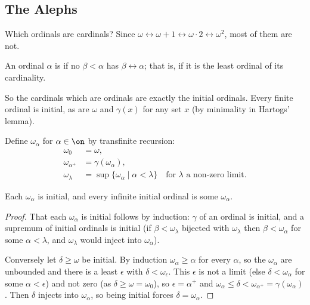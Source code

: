 \subsection{The Alephs}

Which ordinals are cardinals? Since $\omega \leftrightarrow \omega + 1 \leftrightarrow \omega \cdot 2 \leftrightarrow \omega^2$, most of them are not.

\begin{definition}
  An ordinal $\alpha$ is  if no $\beta < \alpha$ has $\beta \leftrightarrow \alpha$; that is, if it is the least ordinal of its cardinality.
\end{definition}

So the cardinals which are ordinals are exactly the initial ordinals. Every finite ordinal is initial, as are $\omega$ and $\gamma(x)$ for any set $x$ (by minimality in Hartogs' lemma).

\begin{definition}
  Define $\omega_\alpha$ for $\alpha \in \on$ by transfinite recursion:
  \begin{align*}
    \omega_0 &= \omega, \\
    \omega_{\alpha^+}&= \gamma(\omega_\alpha), \\
    \omega_{\lambda} &= \sup\{\omega_\alpha\mid \alpha < \lambda\} \quad \text{for } \lambda \text{ a non-zero limit.}
  \end{align*}
\end{definition}

\begin{proposition}
  Each $\omega_\alpha$ is initial, and every infinite initial ordinal is some $\omega_\alpha$.
\end{proposition}
\begin{proof}
  That each $\omega_\alpha$ is initial follows by induction: $\gamma$ of an ordinal is initial, and a supremum of initial ordinals is initial (if $\beta < \omega_\lambda$ bijected with $\omega_\lambda$ then $\beta < \omega_\alpha$ for some $\alpha < \lambda$, and $\omega_\lambda$ would inject into $\omega_\alpha$).

  Conversely let $\delta \geq \omega$ be initial. By induction $\omega_\alpha \geq \alpha$ for every $\alpha$, so the $\omega_\alpha$ are unbounded and there is a least $\epsilon$ with $\delta < \omega_\epsilon$. This $\epsilon$ is not a limit (else $\delta < \omega_\alpha$ for some $\alpha < \epsilon$) and not zero (as $\delta \geq \omega = \omega_0$), so $\epsilon = \alpha^+$ and $\omega_\alpha \leq \delta < \omega_{\alpha^+} = \gamma(\omega_\alpha)$. Then $\delta$ injects into $\omega_\alpha$, so being initial forces $\delta = \omega_\alpha$.
\end{proof}

